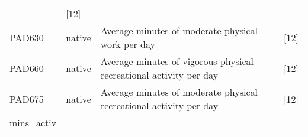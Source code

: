 \documentclass[]{article}
\begin{document}
\begin{longtable}[]{@{}llll@{}}
\begin{minipage}[t]{0.43\columnwidth}
\end{minipage} & \begin{minipage}[t]{0.31\columnwidth}\raggedright
{[}12{]}\strut
\end{minipage}\tabularnewline
\begin{minipage}[t]{0.10\columnwidth}\raggedright
PAD630\strut
\end{minipage} & \begin{minipage}[t]{0.05\columnwidth}\raggedright
native\strut
\end{minipage} & \begin{minipage}[t]{0.43\columnwidth}\raggedright
Average minutes of moderate physical work per day\strut
\end{minipage} & \begin{minipage}[t]{0.31\columnwidth}\raggedright
{[}12{]}\strut
\end{minipage}\tabularnewline
\begin{minipage}[t]{0.10\columnwidth}\raggedright
PAD660\strut
\end{minipage} & \begin{minipage}[t]{0.05\columnwidth}\raggedright
native\strut
\end{minipage} & \begin{minipage}[t]{0.43\columnwidth}\raggedright
Average minutes of vigorous physical recreational activity per day\strut
\end{minipage} & \begin{minipage}[t]{0.31\columnwidth}\raggedright
{[}12{]}\strut
\end{minipage}\tabularnewline
\begin{minipage}[t]{0.10\columnwidth}\raggedright
PAD675\strut
\end{minipage} & \begin{minipage}[t]{0.05\columnwidth}\raggedright
native\strut
\end{minipage} & \begin{minipage}[t]{0.43\columnwidth}\raggedright
Average minutes of moderate physical recreational activity per day\strut
\end{minipage} & \begin{minipage}[t]{0.31\columnwidth}\raggedright
{[}12{]}\strut
\end{minipage}\tabularnewline
\begin{minipage}[t]{0.10\columnwidth}\raggedright
mins\_activ\strut
\end{minipage} & \begin{minipage}[t]{0.05\columnwidth}\raggedright

\end{minipage}
\end{longtable}
\end{document}
